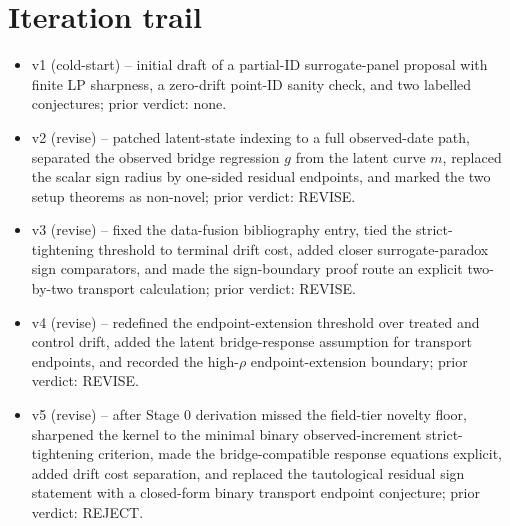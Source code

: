 \documentclass[11pt]{article}
\theoremstyle{definition}
\theoremstyle{plain}
\theoremstyle{remark}
\begin{document}
\section{Iteration trail}
\begin{itemize}[leftmargin=*]
  \item v1 (cold-start) -- initial draft of a partial-ID surrogate-panel proposal with finite LP sharpness, a zero-drift point-ID sanity check, and two labelled conjectures; prior verdict: none.
  \item v2 (revise) -- patched latent-state indexing to a full observed-date path, separated the observed bridge regression \(g\) from the latent curve \(m\), replaced the scalar sign radius by one-sided residual endpoints, and marked the two setup theorems as non-novel; prior verdict: REVISE.
  \item v3 (revise) -- fixed the data-fusion bibliography entry, tied the strict-tightening threshold to terminal drift cost, added closer surrogate-paradox sign comparators, and made the sign-boundary proof route an explicit two-by-two transport calculation; prior verdict: REVISE.
  \item v4 (revise) -- redefined the endpoint-extension threshold over treated and control drift, added the latent bridge-response assumption for transport endpoints, and recorded the high-\(\rho\) endpoint-extension boundary; prior verdict: REVISE.
  \item v5 (revise) -- after Stage 0 derivation missed the field-tier novelty floor, sharpened the kernel to the minimal binary observed-increment strict-tightening criterion, made the bridge-compatible response equations explicit, added drift cost separation, and replaced the tautological residual sign statement with a closed-form binary transport endpoint conjecture; prior verdict: REJECT.
\end{itemize}
\end{document}

